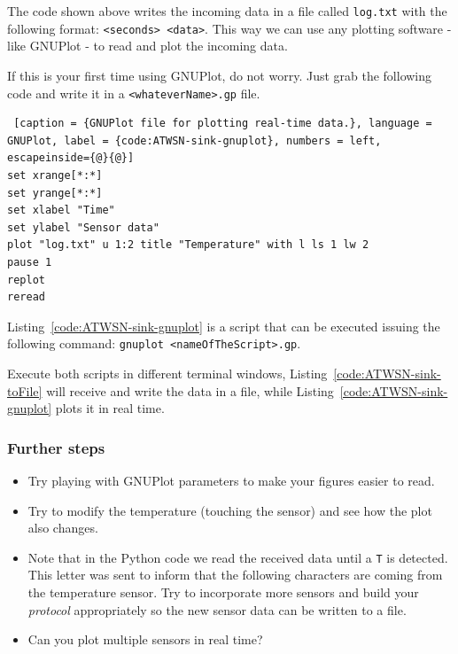 The code shown above writes the incoming data in a file called \texttt{log.txt} with the following format: \texttt{<seconds> <data>}. This way we can use any plotting software - like GNUPlot - to read and plot the incoming data.

If this is your first time using GNUPlot, do not worry. Just grab the following code and write it in a \texttt{<whateverName>.gp} file.

\begin{lstlisting} [caption = {GNUPlot file for plotting real-time data.}, language = GNUPlot, label = {code:ATWSN-sink-gnuplot}, numbers = left, escapeinside={@}{@}]
set xrange[*:*]
set yrange[*:*]
set xlabel "Time"
set ylabel "Sensor data"
plot "log.txt" u 1:2 title "Temperature" with l ls 1 lw 2
pause 1
replot
reread
\end{lstlisting}

Listing~\ref{code:ATWSN-sink-gnuplot} is a script that can be executed issuing the following command: \texttt{gnuplot <nameOfTheScript>.gp}.

Execute both scripts in different terminal windows, Listing~\ref{code:ATWSN-sink-toFile} will receive and write the data in a file, while Listing~\ref{code:ATWSN-sink-gnuplot} plots it in real time.

\subsubsection{Further steps}
\begin{itemize}
 \item Try playing with GNUPlot parameters to make your figures easier to read.
 \item Try to modify the temperature (touching the sensor) and see how the plot also changes.
 \item Note that in the Python code we read the received data until a \texttt{T} is detected. This letter was sent to inform that the following characters are coming from the temperature sensor. Try to incorporate more sensors and build your \emph{protocol} appropriately so the new sensor data can be written to a file.
 \item Can you plot multiple sensors in real time?
\end{itemize}
